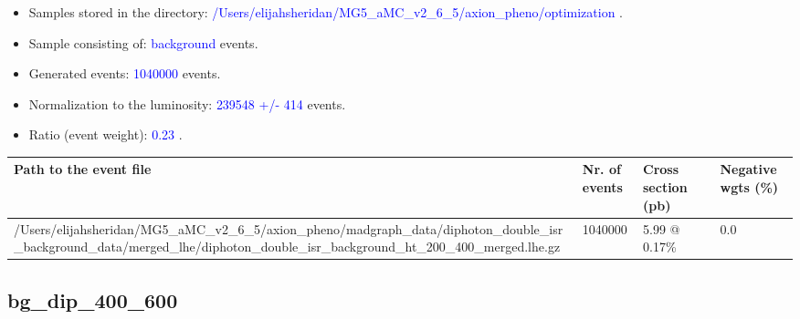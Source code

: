 \documentclass[a4paper, 10pt]{article}
\begin{document}
\begin{itemize}
  \item Samples stored in the directory: \textcolor{blue}{/\-Users/\-elijahsheridan/\-MG5\_aMC\_v2\_6\_5/\-axion\_pheno/\-optimization} .
   \item Sample consisting of: \textcolor{blue}{background}  events.
   \item Generated events: \textcolor{blue}{1040000 }  events.
   \item Normalization to the luminosity: \textcolor{blue}{239548}\textcolor{blue}{ +/\-- }\textcolor{blue}{414 }  events.
   \item Ratio (event weight): \textcolor{blue}{0.23 } .  
 
\end{itemize}
\begin{table}[H]
  \begin{center}
    \begin{tabular}{|m{55.0mm}|m{25.0mm}|m{30.0mm}|m{30.0mm}|}
      \hline
      {\cellcolor{yellow}         Path to the event file}& {\cellcolor{yellow}         Nr. of events}& {\cellcolor{yellow}         Cross section (pb)}& {\cellcolor{yellow}         Negative wgts (\%)}\\
      \hline
      {\cellcolor{white}          /\-Users/\-elijahsheridan/\-MG5\_aMC\_v2\_6\_5/\-axion\_pheno/\-madgraph\_data/\-diphoton\_double\_isr\_background\_data/\-merged\_lhe/\-diphoton\_double\_isr\_background\_ht\_200\_400\_merged.lhe.gz}& {\cellcolor{white}          1040000}& {\cellcolor{white}          5.99 @ 0.17\%}& {\cellcolor{white}          0.0}\\
\hline
    \end{tabular}
  \end{center}
\end{table}

\subsection{ bg\_dip\_400\_600}
\end{document}

